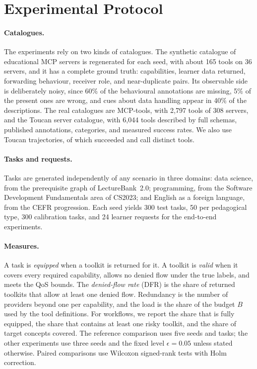\documentclass[10pt]{article}
\begin{document}
\section{Experimental Protocol}\label{sec:setup}

\paragraph{Catalogues.} The experiments rely on two kinds of catalogues. The synthetic catalogue of educational MCP servers is regenerated for each seed, with about 165 tools on 36 servers, and it has a complete ground truth: capabilities, learner data returned, forwarding behaviour, receiver role, and near-duplicate pairs. Its observable side is deliberately noisy, since 60\% of the behavioural annotations are missing, 5\% of the present ones are wrong, and cues about data handling appear in 40\% of the descriptions. The real catalogues are MCP-tools, with 2{,}797 tools of 308 servers, and the Toucan server catalogue, with 6{,}044 tools described by full schemas, published annotations, categories, and measured success rates. We also use \RSvTraces{} Toucan trajectories, of which \RSvSuccess{} succeeded and call \RSvTools{} distinct tools.

\paragraph{Tasks and requests.} Tasks are generated independently of any scenario in three domains: data science, from the prerequisite graph of LectureBank~2.0; programming, from the Software Development Fundamentals area of CS2023; and English as a foreign language, from the CEFR progression. Each seed yields 300 test tasks, 50 per pedagogical type, 300 calibration tasks, and 24 learner requests for the end-to-end experiments.

\paragraph{Measures.} A task is \emph{equipped} when a toolkit is returned for it. A toolkit is \emph{valid} when it covers every required capability, allows no denied flow under the true labels, and meets the QoS bounds. The \emph{denied-flow rate} (DFR) is the share of returned toolkits that allow at least one denied flow. Redundancy is the number of providers beyond one per capability, and the load is the share of the budget $B$ used by the tool definitions. For workflows, we report the share that is fully equipped, the share that contains at least one risky toolkit, and the share of target concepts covered. The reference comparison uses five seeds and \RNTasks{} tasks; the other experiments use three seeds and the fixed level $\epsilon=0.05$ unless stated otherwise. Paired comparisons use Wilcoxon signed-rank tests with Holm correction.
\end{document}
